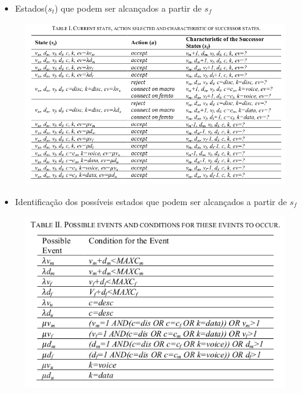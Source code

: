 \begin{frame}
  \begin{itemize}
    \item Estados(\alert{$s _{t}$}) que podem ser alcançados a partir de \alert{$s _{f}$}
  \end{itemize}    
  \begin{figure}
    \includegraphics [scale=0.37]{./Figures/f3}
  \end{figure}  
\end{frame}

\begin{frame}
  \begin{itemize}
    \item Identificação dos possíveis estados que podem ser alcançados a partir de \alert{$s _{f}$}
  \end{itemize}    
  \begin{figure}
    \includegraphics [scale=0.37]{./Figures/f4}
  \end{figure}  
\end{frame}

